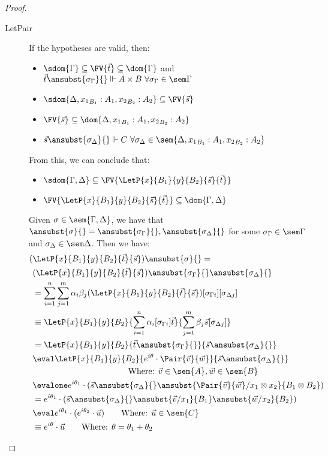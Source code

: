 \begin{proof}
\begin{description}
    \item[LetPair] If the hypotheses are valid, then:
    \begin{itemize}
        \item $\sdom{\Gamma}\subseteq \FV{\vec t} \subseteq \dom{\Gamma}$ and $\vec t \ansubst{\sigma_\Gamma}{}\Vdash A\times B\ \forall \sigma_\Gamma\in\sem\Gamma$
        \item $\sdom{\Delta, {x_1}_{B_1}:A_1, {x_2}_{B_2}:A_2}\subseteq\FV{\vec s}$
        \item $\FV{\vec{s}}\subseteq \dom{\Delta,{x_1}_{B_1}:A_1, {x_2}_{B_2}:A_2}$
        \item $\vec s \ansubst{\sigma_\Delta}{}\Vdash C\ \forall \sigma_\Delta\in\sem{\Delta, {x_1}_{B_1}:A_1, {x_2}_{B_2}:A_2}$
    \end{itemize}
    From this, we can conclude that:
    \begin{itemize}
        \item $\sdom{\Gamma,\Delta}\subseteq\FV{\LetP{x}{B_1}{y}{B_2}{\vec{s}}{\vec{t}}}$
        \item $\FV{\LetP{x}{B_1}{y}{B_2}{\vec{s}}{\vec{t}}}\subseteq\dom{\Gamma,\Delta}$
    \end{itemize}
    
    Given $\sigma\in\sem{\Gamma,\Delta}$, we have that $\ansubst{\sigma}{}=\ansubst{\sigma_\Gamma}{},\ansubst{\sigma_\Delta}{}$ for some $\sigma_\Gamma\in\sem\Gamma$ and $\sigma_\Delta\in\sem\Delta$. Then we have:
    \begin{align*}
        (&\LetP{x}{B_1}{y}{B_2}{\vec{t}}{\vec{s}})\ansubst{\sigma}{} = \\
        &(\LetP{x}{B_1}{y}{B_2}{\vec{t}}{\vec{s}})\ansubst{\sigma_\Gamma}{}\ansubst{\sigma_\Delta}{}\\
        &= \sum_{i=1}^{n}\sum_{j=1}^{m}\alpha_i\beta_j(\LetP{x}{B_1}{y}{B_2}{\vec{t}}{\vec{s}})[\sigma_{\Gamma i}][\sigma_{\Delta j}]\\
        &\equiv \LetP{x}{B_1}{y}{B_2}{\sum_{i=1}^{n}\alpha_i[\sigma_{\Gamma i}]\vec{t}}{\sum_{j=1}^{m}\beta_j \vec{s}[\sigma_{\Delta j}]}\\
        &= \LetP{x}{B_1}{y}{B_2}{\vec{t}\ansubst{\sigma_\Gamma}{}}{\vec{s}\ansubst{\sigma_\Delta}{}}\\
        &\eval \LetP{x}{B_1}{y}{B_2}{e^{i\theta}\cdot\Pair{\vec{v}}{\vec{w}}}{\vec{s}\ansubst{\sigma_\Delta}{}}\\
        &\hspace*{4cm}{\text{Where: }}\vec{v}\in\sem{A},\vec{w}\in\sem{B}\\
        &\evalone e^{i\theta_1}\cdot(\vec{s}\ansubst{\sigma_\Delta}{}\ansubst{\Pair{\vec{v}}{\vec{w}}/x_1\otimes x_2}{B_1\otimes B_2})\\
        &= e^{i\theta_1}\cdot(\vec{s}\ansubst{\sigma_\Delta}{}\ansubst{\vec{v}/x_1}{B_1}\ansubst{\vec{w}/x_2}{B_2})\\
        &\eval e^{i\theta_1}\cdot (e^{i\theta_2}\cdot \vec{u})\qquad\text{Where: }\vec{u}\in\sem{C}\\
        &\equiv e^{i\theta}\cdot \vec{u}\qquad\text{Where: }\theta=\theta_1 + \theta_2
    \end{align*}
    

\end{description}
\end{proof}
